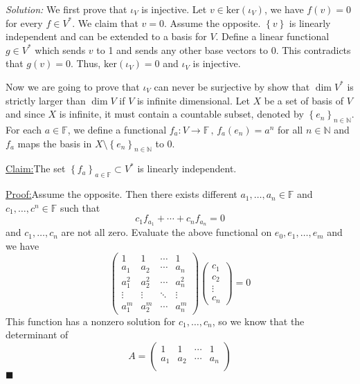 \documentclass[a4paper, 12pt]{article}
\newenvironment{solution}
    {\textit{Solution:}}
    {}
\newenvironment{claim}[1]{\par\noindent\underline{Claim:}\space#1}{}
\newenvironment{claimproof}[1]{\par\noindent\underline{Proof:}\space#1}{\hfill $\blacksquare$}
\begin{document}
\begin{solution}
We first prove that \(\iota_V\) is injective. Let \(v \in \text{ker}(\iota_V)\), we have \(f(v)=0\) for every \(f\in V^*\). We claim that \(v=0\). Assume the opposite. \(\left\{v\right\}\) is linearly independent and can 
be extended to a basis for \(V\). Define a linear functional \(g\in V^*\) which sends \(v\) to 1 and sends any other base vectors to 0. This contradicts that \(g(v)=0\). Thus, \(\text{ker}(\iota_V)=0\) and \(\iota_V\) is injective.
\par 
Now we are going to prove that \(\iota_V\) can never be surjective by show that \(\dim V^*\) is strictly larger than \(\dim V\) if \(V\) is infinite dimensional. Let \(X\) be a set of basis of \(V\) and since \(X\) is infinite, it must contain a 
countable subset, denoted by \(\left\{ e_n \right\}_{n\in \mathbb{N}}\). For each \(a\in \mathbb{F}\), we define a functional \(f_a:V\rightarrow \mathbb{F}\, ,\, f_a(e_n)=a^n \) for all \(n\in \mathbb{N}\) and \(f_a\) maps the basis in \(X\setminus \left\{ e_n \right\}_{n\in \mathbb{N}}\) to \(0\). 
\begin{claim}
The set \(\left\{ f_a \right\}_{a\in \mathbb{F}}\subset V^*\) is linearly independent.
\end{claim}
\begin{claimproof}
Assume the opposite. Then there exists different \(a_1,\ldots,a_n\in \mathbb{F}\) and \(c_1,\ldots,c^n\in \mathbb{F}\) such that 
\[c_1f_{a_1}+\cdots+c_n f_{a_n}=0\]
and \(c_1,\ldots,c_n\) are not all zero. Evaluate the above functional on \(e_0,e_1,\ldots,e_m\) and we have 
\[\begin{pmatrix}
	1   & 1   & \cdots & 1\\ 
	a_1 & a_2 & \cdots & a_n\\ 
	a_1^2 & a_2^2 & \cdots & a_n^2\\ 
	\vdots & \vdots & \ddots & \vdots \\ 
	a_1^m & a_2^m & \cdots & a_n^m
\end{pmatrix}
\begin{pmatrix}
	c_1\\ 
	c_2\\ 
	\vdots\\ 
	c_n
\end{pmatrix}=0\]
This function has a nonzero solution for \(c_1,\ldots,c_n\), so we know that the determinant of 
\[A=\begin{pmatrix}
	1   & 1   & \cdots & 1\\ 
	a_1 & a_2 & \cdots & a_n\\ 

\end{pmatrix}\]
\end{claimproof}
\end{solution}
\end{document}
